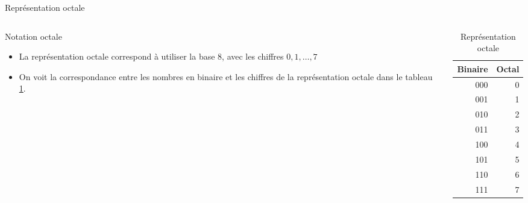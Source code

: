 \documentclass[presentation]{beamer}
\begin{document}
\begin{frame}[label={sec:org14ff5b2}]{Représentation octale}
\begin{columns}
\begin{column}{0.48\columnwidth}
\begin{block}{Notation octale}
\begin{itemize}
\item La représentation octale correspond à utiliser la base 8, avec les chiffres \(0, 1, \ldots, 7\)

\item On voit la correspondance entre les nombres en binaire et les chiffres de la représentation octale dans le tableau \ref{tab:org224cab8}.
\end{itemize}
\end{block}
\end{column}

\begin{column}{0.48\columnwidth}
\begin{block}{}
\begin{table}[htbp]
\caption{\label{tab:org224cab8}Représentation octale}
\centering
\begin{tabular}{rr}
Binaire & Octal\\
\hline
000 & 0\\
001 & 1\\
010 & 2\\
011 & 3\\
100 & 4\\
101 & 5\\
110 & 6\\
111 & 7\\
\end{tabular}
\end{table}
\end{block}
\end{column}
\end{columns}
\end{frame}
\end{document}
